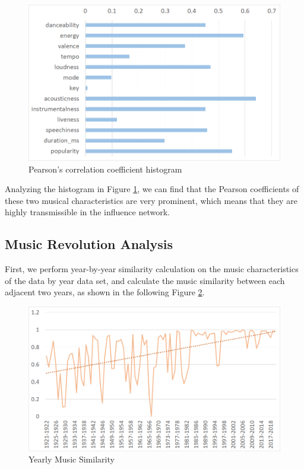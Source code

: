 \documentclass[12pt]{article}  %
\begin{document}
\begin{figure}[htbp]
\centering
\includegraphics[width=.7\textwidth]{img/Pearson.jpg}
\caption{Pearson's correlation coefficient histogram}\label{fig:Pearson}
\end{figure}

Analyzing the histogram in Figure \ref{fig:Pearson}, we can find that the Pearson coefficients of these two musical characteristics are very prominent, which means that they are highly transmissible in the influence network.





\subsection{Music Revolution Analysis}

First, we perform year-by-year similarity calculation on the music characteristics of the data by year data set, and calculate the music similarity between each adjacent two years, as shown in the following Figure \ref{fig:Yearly Music Similarity}. 

\begin{figure}[htbp]
\centering
\includegraphics[width=.7\textwidth]{img/Similarity year by year.jpg}
\caption{Yearly Music Similarity}\label{fig:Yearly Music Similarity}
\end{figure}
\end{document}
